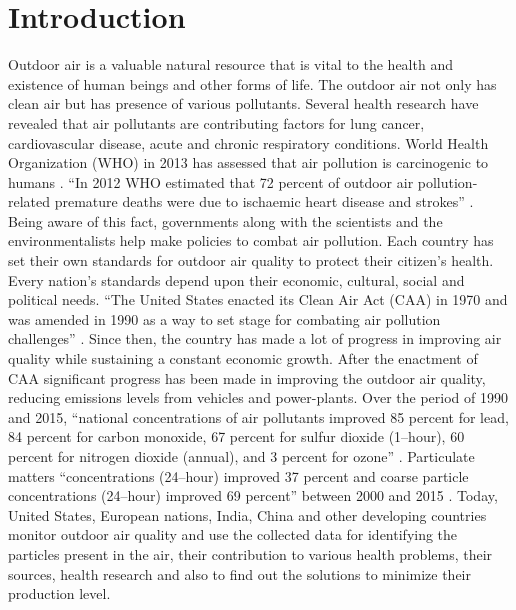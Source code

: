 \documentclass[sigconf]{acmart}
\begin{document}


\maketitle



\section{Introduction}
   Outdoor air is a valuable natural resource that is vital to the health and existence of human beings and other forms of life. The outdoor air not only has clean air but has presence of various pollutants. Several health research have revealed that air pollutants are contributing factors for lung cancer, cardiovascular disease, acute and chronic respiratory conditions. World Health Organization (WHO) in 2013 has assessed that air pollution is carcinogenic to humans \cite{www-who}. ``In 2012 WHO estimated that 72 percent of outdoor air pollution-related premature deaths were due to ischaemic heart disease and strokes'' \cite{www-who}.
   Being aware of this fact, governments along with the scientists and the environmentalists help make policies to combat air pollution. Each country has set their own standards for outdoor air quality to protect their citizen's health. Every nation's standards depend upon their economic, cultural, social and political needs. ``The United States enacted its Clean Air Act (CAA) in 1970 and was amended in 1990 as a way to set stage for combating air pollution challenges'' \cite{epa-gov}. Since then, the country has made a lot of progress in improving air quality while sustaining a constant economic growth. After the enactment of CAA significant progress has been made in improving the outdoor air quality, reducing emissions levels from vehicles and power-plants. Over the period of 1990 and 2015, ``national concentrations of air pollutants improved 85 percent for lead, 84 percent for carbon monoxide, 67 percent for sulfur dioxide (1--hour), 60 percent for nitrogen dioxide (annual), and 3 percent for ozone'' \cite{epa-gov}. Particulate matters ``concentrations (24--hour) improved 37 percent and coarse particle concentrations (24--hour) improved 69 percent'' between 2000 and 2015 \cite{epa-gov}.
   Today, United States, European nations, India, China and other developing countries monitor outdoor air quality and use the collected data for identifying the particles present in the air, their contribution to various health problems, their sources, health research and also to find out the solutions to minimize their production level.
\end{document}
